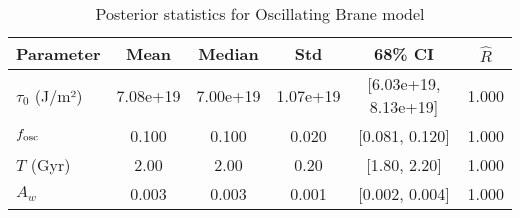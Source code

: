 \begin{table}[htbp]
\centering
\caption{Posterior statistics for Oscillating Brane model}
\begin{tabular}{lccccc}
\hline
Parameter & Mean & Median & Std & 68\% CI & $\hat{R}$ \\
\hline
$\tau_0$ (J/m²) & 7.08e+19 & 7.00e+19 & 1.07e+19 & [6.03e+19, 8.13e+19] & 1.000 \\
$f_{\rm osc}$ & 0.100 & 0.100 & 0.020 & [0.081, 0.120] & 1.000 \\
$T$ (Gyr) & 2.00 & 2.00 & 0.20 & [1.80, 2.20] & 1.000 \\
$A_w$ & 0.003 & 0.003 & 0.001 & [0.002, 0.004] & 1.000 \\
\hline
\end{tabular}
\label{tab:posterior}
\end{table}